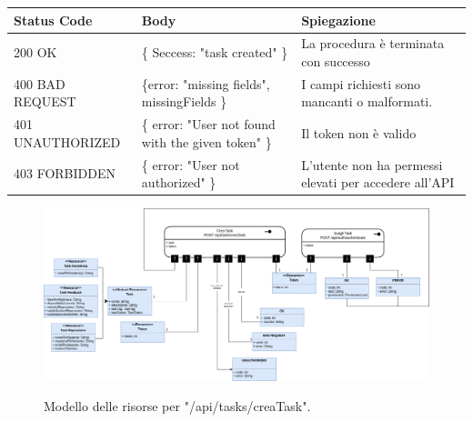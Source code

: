 \documentclass{report}
\begin{document}
\begin{center} %
	\centering
	\begin{tabular}{ |p{4cm}|p{4cm}|p{4cm}| }
		\hline
		\centering Status Code & \qquad\qquad\quad Body & \qquad\quad Spiegazione\\ %
		\hline
		200 OK & \{ Seccess: "task created" \}  & La procedura è terminata con successo	\\ 
		\hline
		400 BAD REQUEST & \{error: "missing fields", missingFields \} & I campi richiesti sono mancanti o malformati. \\
		\hline
		401 UNAUTHORIZED & \{ error: "User not found with the given token" \} & Il token non è valido \\
		\hline
		403 FORBIDDEN & \{ error: "User not authorized" \} &  L'utente non ha permessi elevati per accedere all'API \\
		\hline
	\end{tabular}
\end{center}
\begin{figure}[H]
	\centering\includegraphics[width=1\textwidth]{images/model_crea_task.png}
	
	Modello delle risorse per "/api/tasks/creaTask".
\end{figure}
\end{document}
